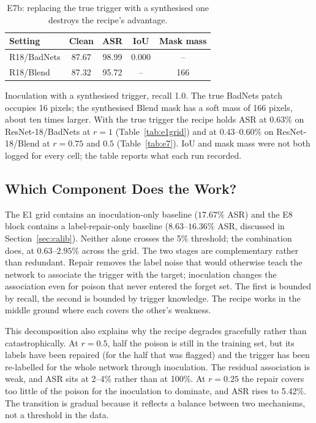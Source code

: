 \begin{table}[t]
\centering
\caption{E7b: replacing the true trigger with a synthesised one destroys the
recipe's advantage.}
\label{tab:e7b}
\footnotesize
\begin{tabular}{lcccc}
\toprule
\textbf{Setting} & \textbf{Clean} & \textbf{ASR} & \textbf{IoU} & \textbf{Mask mass} \\
\midrule
R18/BadNets & 87.67 & 98.99 & 0.000 & -- \\
R18/Blend & 87.32 & 95.72 & -- & 166 \\
\bottomrule
\end{tabular}
\par\vspace{1pt}\footnotesize\raggedright Inoculation with a synthesised trigger,
recall 1.0. The true BadNets patch occupies 16 pixels; the synthesised Blend mask
has a soft mass of 166 pixels, about ten times larger. With the true trigger the
recipe holds ASR at $0.63\%$ on ResNet-18/BadNets at $r{=}1$
(Table~\ref{tab:e1grid}) and at $0.43$--$0.60\%$ on ResNet-18/Blend at
$r{=}0.75$ and $0.5$ (Table~\ref{tab:e7}). IoU and mask mass were not both logged
for every cell; the table reports what each run recorded.
\end{table}

\subsection{Which Component Does the Work?}
The E1 grid contains an inoculation-only baseline ($17.67\%$ ASR) and the E8
block contains a label-repair-only baseline ($8.63$--$16.36\%$ ASR, discussed in
Section~\ref{sec:calib}). Neither alone crosses the 5\% threshold; the
combination does, at $0.63$--$2.95\%$ across the grid. The two stages are
complementary rather than redundant. Repair removes the label noise that would
otherwise teach the network to associate the trigger with the target; inoculation
changes the association even for poison that never entered the forget set. The
first is bounded by recall, the second is bounded by trigger knowledge. The
recipe works in the middle ground where each covers the other's weakness.

This decomposition also explains why the recipe degrades gracefully rather than
catastrophically. At $r{=}0.5$, half the poison is still in the training set,
but its labels have been repaired (for the half that was flagged) and the trigger
has been re-labelled for the whole network through inoculation. The residual
association is weak, and ASR sits at 2--4\% rather than at 100\%. At $r{=}0.25$
the repair covers too little of the poison for the inoculation to dominate, and
ASR rises to 5.42\%. The transition is gradual because it reflects a balance
between two mechanisms, not a threshold in the data.


